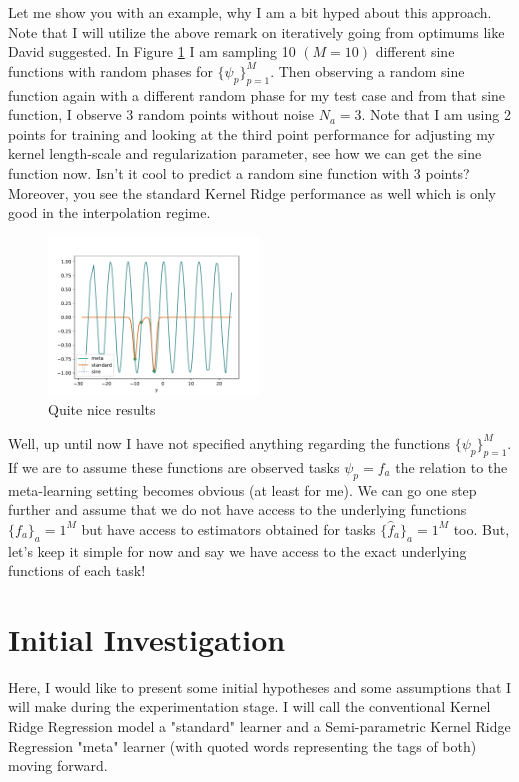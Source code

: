 \documentclass{tran-l}
\theoremstyle{definition}
\theoremstyle{remark}
\numberwithin{equation}{section}
\begin{document}
{Let me show you with an example, why I am a bit hyped about this approach. Note that I will utilize the above remark on iteratively going from optimums like David suggested. In Figure \ref{fig:point} I am sampling 10 $(M=10)$ different sine functions with random phases for $\{\psi_p\}_{p=1}^M$. Then observing a random sine function again with a different random phase for my test case and from that sine function, I observe 3 random points without noise $N_a=3$. Note that I am using 2 points for training and looking at the third point performance for adjusting my kernel length-scale and regularization parameter, see how we can get the sine function now. Isn't it cool to predict a random sine function with 3 points? Moreover, you see the standard Kernel Ridge performance as well which is only good in the interpolation regime.

\begin{figure}
  \includegraphics[width=0.5\textwidth]{Figures/marco.pdf}
  \caption{Quite nice results}
  \label{fig:point}
\end{figure}

\rem Well, up until now I have not specified anything regarding the functions $\{\psi_p\}_{p=1}^M$. If we are to assume these functions are observed tasks $\psi_p= f_a$ the relation to the meta-learning setting becomes obvious (at least for me). We can go one step further and assume that we do not have access to the underlying functions $\{f_a\}_a=1^{M}$ but have access to estimators obtained for tasks $\{\hat{f}_a\}_a=1^{M}$ too. But, let's keep it simple for now and say we have access to the exact underlying functions of each task!

\section{Initial Investigation}

Here, I would like to present some initial hypotheses and some assumptions that I will make during the experimentation stage. I will call the conventional Kernel Ridge Regression model a "standard" learner and a Semi-parametric Kernel Ridge Regression "meta" learner (with quoted words representing the tags of both) moving forward.

}
\end{document}
